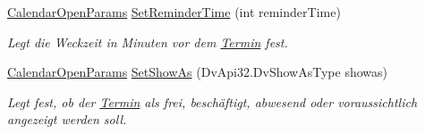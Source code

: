 \begin{DoxyCompactItemize}
\hyperlink{class_products_1_1_model_1_1_entities_1_1_calendar_open_params}{Calendar\+Open\+Params} \hyperlink{class_products_1_1_model_1_1_entities_1_1_calendar_open_params_a4ddaa6da9aa8df372ac14252a898050c}{Set\+Reminder\+Time} (int reminder\+Time)
\begin{DoxyCompactList}\small\item\em Legt die Weckzeit in Minuten vor dem \hyperlink{class_products_1_1_model_1_1_entities_1_1_termin}{Termin} fest. \end{DoxyCompactList}\item 
\hyperlink{class_products_1_1_model_1_1_entities_1_1_calendar_open_params}{Calendar\+Open\+Params} \hyperlink{class_products_1_1_model_1_1_entities_1_1_calendar_open_params_a3e8785a17e9316a3337152ffe34431c5}{Set\+Show\+As} (Dv\+Api32.\+Dv\+Show\+As\+Type showas)
\begin{DoxyCompactList}\small\item\em Legt fest, ob der \hyperlink{class_products_1_1_model_1_1_entities_1_1_termin}{Termin} als frei, beschäftigt, abwesend oder voraussichtlich angezeigt werden soll. \end{DoxyCompactList}\end{DoxyCompactItemize}
